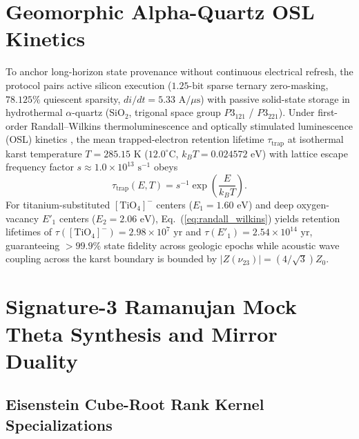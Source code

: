 \documentclass[aps,prl,twocolumn,superscriptaddress,10pt]{revtex4-2}
\begin{document}
\section{Geomorphic Alpha-Quartz OSL Kinetics}

To anchor long-horizon state provenance without continuous electrical refresh, the protocol pairs active silicon execution ($1.25\text{-bit}$ sparse ternary zero-masking, $78.125\%$ quiescent sparsity, $di/dt = 5.33\text{ A}/\mu\text{s}$) with passive solid-state storage in hydrothermal $\alpha$-quartz ($\text{SiO}_2$, trigonal space group $P3_121$ / $P3_221$). Under first-order Randall--Wilkins thermoluminescence and optically stimulated luminescence (OSL) kinetics \cite{RandallWilkins1945}, the mean trapped-electron retention lifetime $\tau_{\text{trap}}$ at isothermal karst temperature $T = 285.15\text{ K}$ ($12.0^\circ\text{C}$, $k_B T = 0.024572\text{ eV}$) with lattice escape frequency factor $s \approx 1.0\times 10^{13}\text{ s}^{-1}$ obeys
\begin{equation}
\tau_{\text{trap}}(E, T) = s^{-1} \exp\!\left(\frac{E}{k_B T}\right).
\label{eq:randall_wilkins}
\end{equation}
For titanium-substituted $[\text{TiO}_4]^-$ centers ($E_1 = 1.60\text{ eV}$) and deep oxygen-vacancy $E'_1$ centers ($E_2 = 2.06\text{ eV}$), Eq.~(\ref{eq:randall_wilkins}) yields retention lifetimes of $\tau([\text{TiO}_4]^-) = 2.98 \times 10^7\text{ yr}$ and $\tau(E'_1) = 2.54 \times 10^{14}\text{ yr}$, guaranteeing $>99.9\%$ state fidelity across geologic epochs while acoustic wave coupling across the karst boundary is bounded by $|Z(\nu_{23})| = (4/\sqrt{3})Z_0$.

\section{Signature-3 Ramanujan Mock Theta Synthesis and Mirror Duality}

\subsection{Eisenstein Cube-Root Rank Kernel Specializations}
\end{document}
